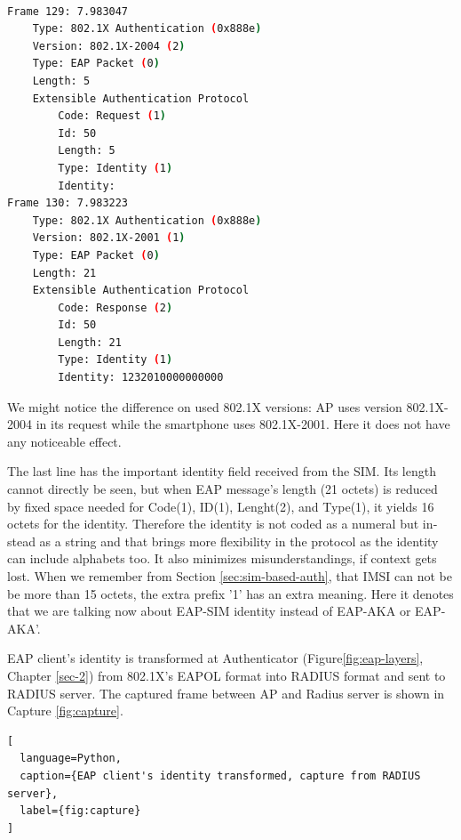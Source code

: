 \documentclass[12pt,a4paper,english]{tutthesis}
\begin{document}
\begin{otherlanguage}{english}
\renewcommand{\lstlistingname}{Capture}

\begin{lstlisting}[language=bash,
  label=capimsi,
  caption={First indication of IMSI, capture from WPA2-supplicant}
]

Frame 129: 7.983047
    Type: 802.1X Authentication (0x888e)
    Version: 802.1X-2004 (2)
    Type: EAP Packet (0)
    Length: 5
    Extensible Authentication Protocol
        Code: Request (1)
        Id: 50
        Length: 5
        Type: Identity (1)
        Identity: 
Frame 130: 7.983223
    Type: 802.1X Authentication (0x888e)
    Version: 802.1X-2001 (1)
    Type: EAP Packet (0)
    Length: 21
    Extensible Authentication Protocol
        Code: Response (2)
        Id: 50
        Length: 21
        Type: Identity (1)
        Identity: 1232010000000000
\end{lstlisting}
\normalsize

We might notice the difference on used 802.1X versions: AP uses version
802.1X-2004 in its request while the smartphone uses 802.1X-2001. Here
it does not have any  noticeable effect.

The last line has the important identity field received from the SIM.
Its length cannot directly be seen, but when EAP message's length (21
octets) is reduced by fixed space needed for Code(1), ID(1),
Lenght(2), and Type(1), it yields 16 octets for the
identity. Therefore the identity is not coded as a 
numeral but instead as a string and that brings more flexibility in
the protocol as the identity can include alphabets too. It also
minimizes misunderstandings, if context gets lost. 
When we remember from Section \ref{sec:sim-based-auth}, that IMSI can not be
be more than 15 octets, the extra prefix '1' has an extra meaning.
Here it denotes that we are talking  now about EAP-SIM identity instead of
EAP-AKA or EAP-AKA'.





EAP client's identity is transformed at Authenticator
(Figure\ref{fig:eap-layers}, Chapter \ref{sec-2}) from 802.1X's 
EAPOL format  into RADIUS format and
sent to RADIUS server. The captured frame between AP and Radius server is
shown
in Capture \ref{fig:capture}.


\renewcommand{\lstlistingname}{Capture}
\begin{lstlisting}[
  language=Python,
  caption={EAP client's identity transformed, capture from RADIUS server},
  label={fig:capture}
]


\end{lstlisting}
\end{otherlanguage}
\end{document}

